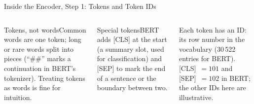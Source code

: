 \documentclass[aspectratio=169,10pt]{beamer}
\begin{document}
\begin{frame}{Inside the Encoder, Step 1: Tokens and Token IDs}
\begin{columns}[T]
\begin{cbox}{Tokens, not words}\scriptsize Common words are one token; long or rare words split into pieces (``\#\#'' marks a continuation in BERT's tokenizer). Treating tokens as words is fine for intuition.\end{cbox}
\begin{cbox}{Special tokens}\scriptsize BERT adds [CLS] at the start (a summary slot, used for classification) and [SEP] to mark the end of a sentence or the boundary between two.\end{cbox}
\begin{ibox}\scriptsize Each token has an ID: its row number in the vocabulary (30\,522 entries for BERT). [CLS]~$=101$ and [SEP]~$=102$ in BERT; the other IDs here are illustrative.\end{ibox}
\end{columns}
\end{frame}
\end{document}
